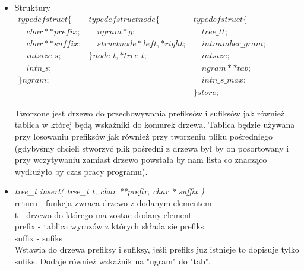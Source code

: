 \documentclass[12pt,a4paper]{report}
\begin{document}
		\begin{itemize}
			\item Struktury \\
		$	\begin{array}{lll}
				typedef struct \{ 				& typedef struct node \{ 					& typedef struct \{ \\ 
				\hspace{1em}char ** prefix; 	& 	\hspace{1em}ngram * g; 					& \hspace{1em}	tree\_t t; \\ 
				\hspace{1em}char ** suffix; 	& 	\hspace{1em}struct node *left, *right; 	& \hspace{1em}	int number\_gram; \\ 
					\hspace{1em}int size\_s; 	& \} node\_t, *tree\_t; 					& 	\hspace{1em}int size; \\ 
						\hspace{1em}int n\_s; 	&  											& \hspace{1em}	ngram** tab; \\ 
					\} ngram; 					&  											& 	\hspace{1em}int n\_s\_max; \\ 
												&  											& \} store;
			\end{array} $ \linebreak
			
			Tworzone jest drzewo do przechowywania prefiksów i sufiksów jak również tablica w której będą wskaźniki do komurek drzewa. Tablica będzie używana przy losowaniu prefiksów jak również przy tworzeniu pliku pośredniego (gdybyśmy chcieli stworzyć plik pośredni z drzewa był by on posortowany i przy wczytywaniu zamiast drzewo powstała by nam lista co znacząco wydłużyło by czas pracy programu).
			
			\item \textit{tree\_t insert( tree\_t t, char **prefix, char * suffix )}\\
			return - funkcja zwraca drzewo z dodanym elementem \\
			t - drzewo do którego ma zostac dodany element \\
			prefix - tablica wyrazów z których składa sie prefiks \\
			suffix - sufiks \\
			Wstawia do drzewa prefiksy i sufiksy, jeśli prefiks juz istnieje to dopisuje tylko sufiks. Dodaje również wzkaźnik na "ngram" do "tab".
			

\end{itemize}
\end{document}
